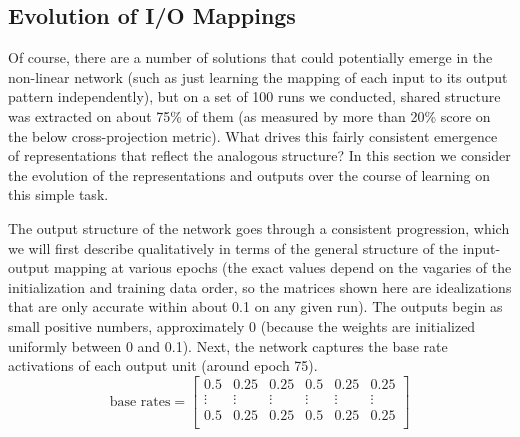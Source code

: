 \documentclass[10pt,letterpaper]{article}
\begin{document}
\subsection{Evolution of I/O Mappings}
%
Of course, there are a number of solutions that could potentially emerge in the non-linear network (such as just learning the mapping of each input to its output pattern independently), but on a set of 100 runs we conducted, shared structure was extracted on about 75\% of them (as measured by more than 20\% score on the below cross-projection metric). What drives this fairly consistent emergence of representations that reflect the analogous structure? In this section we consider the evolution of the representations and outputs over the course of learning on this simple task. \par 
The output structure of the network goes through a consistent progression, which we will first describe qualitatively in terms of the general structure of the input-output mapping at various epochs (the exact values depend on the vagaries of the initialization and training data order, so the matrices shown here are idealizations that are only accurate within about 0.1 on any given run). The outputs begin as small positive numbers, approximately 0 (because the weights are initialized uniformly between 0 and 0.1). Next, the network captures the base rate activations of each output unit (around epoch 75).
{ 
\[ 
\text{base rates} = \left[ \begin{matrix} 
0.5 & 0.25 & 0.25 & 0.5 & 0.25 & 0.25 \\
\vdots & \vdots &\vdots &\vdots &\vdots &\vdots \\
 0.5 & 0.25 & 0.25 & 0.5 & 0.25 & 0.25\\
\end{matrix}  \right] 
\] 
}
\end{document}
